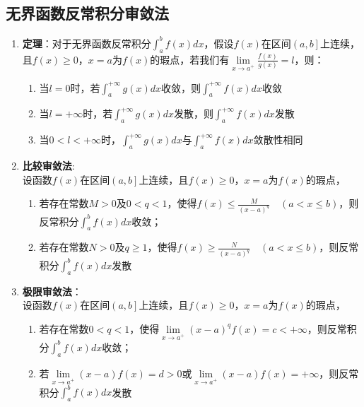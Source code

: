 \documentclass[12pt,a4paper,UTF8]{book}
\begin{document}
\subsection{无界函数反常积分审敛法}
\begin{enumerate}
\item \textbf{定理}：对于无界函数反常积分$\int_{a}^{b}f\left(x\right)dx$，假设$f\left(x\right)$在区间$\left(a,b\right]$上连续，且$f\left(x\right)\geq0$，$x=a$为$f\left(x\right)$的瑕点，若我们有$\lim\limits_{x\to a^{+}}\frac{f\left(x\right)}{g\left(x\right)}=l$，则：
\begin{enumerate}
\item 当$l=0$时，若$\int_{a}^{+\infty}g\left(x\right)dx$收敛，则$\int_{a}^{+\infty}f\left(x\right)dx$收敛
\item 当$l=+\infty$时，若$\int_{a}^{+\infty}g\left(x\right)dx$发散，则$\int_{a}^{+\infty}f\left(x\right)dx$发散
\item 当$0<l<+\infty$时，$\int_{a}^{+\infty}g\left(x\right)dx$与$\int_{a}^{+\infty}f\left(x\right)dx$敛散性相同
\end{enumerate}
\item \textbf{比较审敛法}:\\
设函数$f\left(x\right)$在区间$\left(a,b\right]$上连续，且$f\left(x\right)\geq0$，$x=a$为$f\left(x\right)$的瑕点，
\begin{enumerate}
\item 若存在常数$M>0$及$0<q<1$，使得$f\left(x\right)\le\frac{M}{\left(x-a\right)^q}\quad\left(a<x\le b\right)$，则反常积分$\int_{a}^{b}f\left(x\right)dx$收敛；
\item 若存在常数$N>0$及$q\geq1$，使得$f\left(x\right)\geq\frac{N}{\left(x-a\right)^q}\quad\left(a<x\le b\right)$，则反常积分$\int_{a}^{b}f\left(x\right)dx$发散
\end{enumerate}
\item \textbf{极限审敛法}：\\
设函数$f\left(x\right)$在区间$\left(a,b\right]$上连续，且$f\left(x\right)\geq0$，$x=a$为$f\left(x\right)$的瑕点，
\begin{enumerate}
\item 若存在常数$0<q<1$，使得$\lim\limits_{x\to a^{+}}\left(x-a\right)^qf\left(x\right)=c<+\infty$，则反常积分$\int_{a}^{b}f\left(x\right)dx$收敛；
\item 若$\lim\limits_{x\to a^{+}}\left(x-a\right)f\left(x\right)=d>0$或$\lim\limits_{x\rightarrow a^{+}}\left(x-a\right)f\left(x\right)=+\infty$，则反常积分$\int_{a}^{b}f\left(x\right)dx$发散
\end{enumerate}
\end{enumerate}
\end{document}
